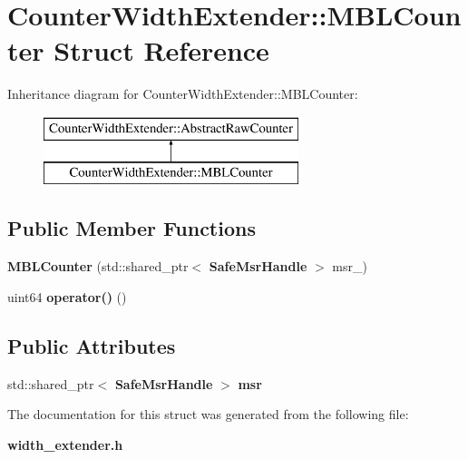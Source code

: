 \section{Counter\+Width\+Extender\+:\+:M\+B\+L\+Counter Struct Reference}
\label{structCounterWidthExtender_1_1MBLCounter}
Inheritance diagram for Counter\+Width\+Extender\+:\+:M\+B\+L\+Counter\+:\begin{figure}[H]
\begin{center}
\leavevmode
\includegraphics[height=2.000000cm]{structCounterWidthExtender_1_1MBLCounter}
\end{center}
\end{figure}
\subsection*{Public Member Functions}
\begin{DoxyCompactItemize}
\item 
\mbox{\label{structCounterWidthExtender_1_1MBLCounter_ac13b8a75a9f0e948d105f4d4b0039c96}} 
{\bfseries M\+B\+L\+Counter} (std\+::shared\+\_\+ptr$<$ \textbf{ Safe\+Msr\+Handle} $>$ msr\+\_\+)
\item 
\mbox{\label{structCounterWidthExtender_1_1MBLCounter_a59d60249fca8c0ebbfda0fb907a8541b}} 
uint64 {\bfseries operator()} ()
\end{DoxyCompactItemize}
\subsection*{Public Attributes}
\begin{DoxyCompactItemize}
\item 
\mbox{\label{structCounterWidthExtender_1_1MBLCounter_a59be96131241a483193530c52258ad00}} 
std\+::shared\+\_\+ptr$<$ \textbf{ Safe\+Msr\+Handle} $>$ {\bfseries msr}
\end{DoxyCompactItemize}


The documentation for this struct was generated from the following file\+:\begin{DoxyCompactItemize}
\item 
\textbf{ width\+\_\+extender.\+h}\end{DoxyCompactItemize}
